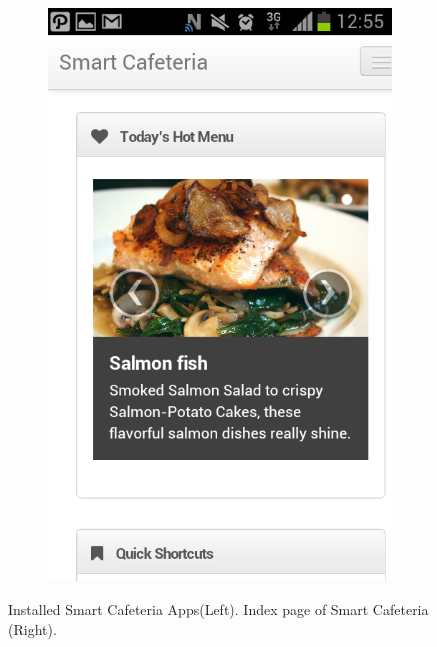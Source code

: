 \begin{figure}[h]
{\begin{subfigure}[b]{.5\textwidth}
{  \includegraphics[width=0.9\linewidth]{ch4/Prototype/Mobile/mobile-index.png}
  }
\end{subfigure}
}
\caption{Installed Smart Cafeteria Apps(Left). Index page of Smart Cafeteria (Right).}
\label{fig:PMInstalledIndex}
\end{figure}
\newpage

